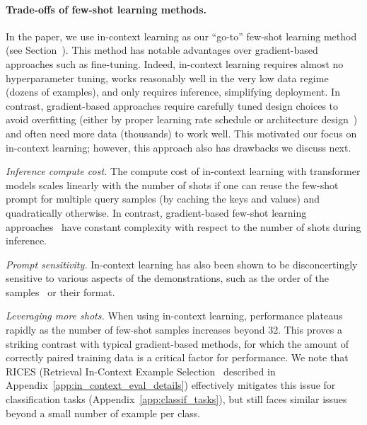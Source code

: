 \paragraph{Trade-offs of few-shot learning methods.}
In the paper, we use in-context learning as our ``go-to'' few-shot learning method (see Section~).
This method has notable advantages over gradient-based approaches such as fine-tuning.
Indeed, in-context learning requires almost no hyperparameter tuning, works reasonably well in the very low data regime (dozens of examples), and only requires inference, simplifying deployment.
In contrast, gradient-based approaches require carefully tuned design choices to avoid overfitting (either by proper learning rate schedule or architecture design~\citep{houlsby2019parameter}) and often need more data (thousands) to work well.
This motivated our focus on in-context learning;
however, this approach also has drawbacks we discuss next.

\noindent
\textit{Inference compute cost.} 
The compute cost of in-context learning with transformer models scales linearly with the number of shots if one can reuse the few-shot prompt for multiple query samples (by caching the keys and values) and quadratically otherwise.
In contrast, gradient-based few-shot learning approaches~\citep{houlsby2019parameter} have constant complexity with respect to the number of shots during inference.

\noindent
\textit{Prompt sensitivity.}
In-context learning has also been shown to be disconcertingly sensitive to various aspects of the demonstrations, such as the order of the samples~\citep{zhao2021calibrate} or their format.

\noindent
\textit{Leveraging more shots.}
When using in-context learning, performance plateaus rapidly as the number of few-shot samples increases beyond 32.
This proves a striking contrast with typical gradient-based methods, for which the amount of correctly paired training data is a critical factor for performance.
We note that RICES (Retrieval In-Context Example Selection~\citep{yang2021empirical} described in Appendix~\ref{app:in_context_eval_details}) effectively mitigates this issue for classification tasks (Appendix~\ref{app:classif_tasks}), but still faces similar issues beyond a small number of example per class.

